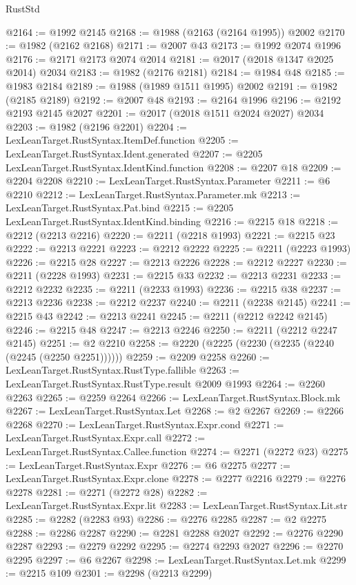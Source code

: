 \begin{lexlean}{RustStd}
\begin{coremodule}
@2164 := @1992 @2145
@2168 := @1988 (@2163 (@2164 @1995)) @2002
@2170 := @1982 (@2162 @2168)
@2171 := @2007 @43
@2173 := @1992 @2074 @1996
@2176 := @2171 @2173 @2074 @2014
@2181 := @2017 (@2018 @1347 @2025 @2014) @2034
@2183 := @1982 (@2176 @2181)
@2184 := @1984 @48
@2185 := @1983 @2184
@2189 := @1988 (@1989 @1511 @1995) @2002
@2191 := @1982 (@2185 @2189)
@2192 := @2007 @48
@2193 := @2164 @1996
@2196 := @2192 @2193 @2145 @2027
@2201 := @2017 (@2018 @1511 @2024 @2027) @2034
@2203 := @1982 (@2196 @2201)
@2204 := LexLeanTarget.RustSyntax.ItemDef.function
@2205 := LexLeanTarget.RustSyntax.Ident.generated
@2207 := @2205 LexLeanTarget.RustSyntax.IdentKind.function
@2208 := @2207 @18
@2209 := @2204 @2208
@2210 := LexLeanTarget.RustSyntax.Parameter
@2211 := @6 @2210
@2212 := LexLeanTarget.RustSyntax.Parameter.mk
@2213 := LexLeanTarget.RustSyntax.Pat.bind
@2215 := @2205 LexLeanTarget.RustSyntax.IdentKind.binding
@2216 := @2215 @18
@2218 := @2212 (@2213 @2216)
@2220 := @2211 (@2218 @1993)
@2221 := @2215 @23
@2222 := @2213 @2221
@2223 := @2212 @2222
@2225 := @2211 (@2223 @1993)
@2226 := @2215 @28
@2227 := @2213 @2226
@2228 := @2212 @2227
@2230 := @2211 (@2228 @1993)
@2231 := @2215 @33
@2232 := @2213 @2231
@2233 := @2212 @2232
@2235 := @2211 (@2233 @1993)
@2236 := @2215 @38
@2237 := @2213 @2236
@2238 := @2212 @2237
@2240 := @2211 (@2238 @2145)
@2241 := @2215 @43
@2242 := @2213 @2241
@2245 := @2211 (@2212 @2242 @2145)
@2246 := @2215 @48
@2247 := @2213 @2246
@2250 := @2211 (@2212 @2247 @2145)
@2251 := @2 @2210
@2258 := @2220 (@2225 (@2230 (@2235 (@2240 (@2245 (@2250 @2251))))))
@2259 := @2209 @2258
@2260 := LexLeanTarget.RustSyntax.RustType.fallible
@2263 := LexLeanTarget.RustSyntax.RustType.result @2009 @1993
@2264 := @2260 @2263
@2265 := @2259 @2264
@2266 := LexLeanTarget.RustSyntax.Block.mk
@2267 := LexLeanTarget.RustSyntax.Let
@2268 := @2 @2267
@2269 := @2266 @2268
@2270 := LexLeanTarget.RustSyntax.Expr.cond
@2271 := LexLeanTarget.RustSyntax.Expr.call
@2272 := LexLeanTarget.RustSyntax.Callee.function
@2274 := @2271 (@2272 @23)
@2275 := LexLeanTarget.RustSyntax.Expr
@2276 := @6 @2275
@2277 := LexLeanTarget.RustSyntax.Expr.clone
@2278 := @2277 @2216
@2279 := @2276 @2278
@2281 := @2271 (@2272 @28)
@2282 := LexLeanTarget.RustSyntax.Expr.lit
@2283 := LexLeanTarget.RustSyntax.Lit.str
@2285 := @2282 (@2283 @93)
@2286 := @2276 @2285
@2287 := @2 @2275
@2288 := @2286 @2287
@2290 := @2281 @2288 @2027
@2292 := @2276 @2290 @2287
@2293 := @2279 @2292
@2295 := @2274 @2293 @2027
@2296 := @2270 @2295
@2297 := @6 @2267
@2298 := LexLeanTarget.RustSyntax.Let.mk
@2299 := @2215 @109
@2301 := @2298 (@2213 @2299)

\end{coremodule}
\end{lexlean}
